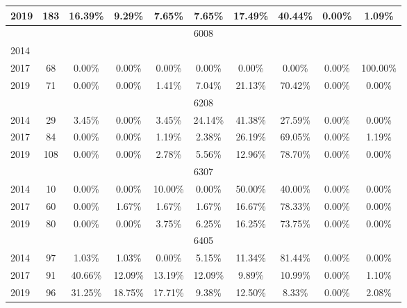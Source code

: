 \begin{table}[H]
\begin{tabular}{|l|c|ccc|ccc|cc|}
2019 & 183 & 16.39\% & 9.29\% & 7.65\% & 7.65\% & 17.49\% & 40.44\% & 0.00\% & 1.09\%\\
\hline
\hline
\multicolumn{10}{|c|}{6008}\\
\hline
2014 & & & & & & & & & \\
2017 & 68 & 0.00\% & 0.00\% & 0.00\% & 0.00\% & 0.00\% & 0.00\% & 0.00\% & 100.00\%\\
2019 & 71 & 0.00\% & 0.00\% & 1.41\% & 7.04\% & 21.13\% & 70.42\% & 0.00\% & 0.00\%\\
\hline
\hline
\multicolumn{10}{|c|}{6208}\\
\hline
2014 & 29 & 3.45\% & 0.00\% & 3.45\% & 24.14\% & 41.38\% & 27.59\% & 0.00\% & 0.00\%\\
2017 & 84 & 0.00\% & 0.00\% & 1.19\% & 2.38\% & 26.19\% & 69.05\% & 0.00\% & 1.19\%\\
2019 & 108 & 0.00\% & 0.00\% & 2.78\% & 5.56\% & 12.96\% & 78.70\% & 0.00\% & 0.00\%\\
\hline
\hline
\multicolumn{10}{|c|}{6307}\\
\hline
2014 & 10 & 0.00\% & 0.00\% & 10.00\% & 0.00\% & 50.00\% & 40.00\% & 0.00\% & 0.00\%\\
2017 & 60 & 0.00\% & 1.67\% & 1.67\% & 1.67\% & 16.67\% & 78.33\% & 0.00\% & 0.00\%\\
2019 & 80 & 0.00\% & 0.00\% & 3.75\% & 6.25\% & 16.25\% & 73.75\% & 0.00\% & 0.00\%\\
\hline
\hline
\multicolumn{10}{|c|}{6405}\\
\hline
2014 & 97 & 1.03\% & 1.03\% & 0.00\% & 5.15\% & 11.34\% & 81.44\% & 0.00\% & 0.00\%\\
2017 & 91 & 40.66\% & 12.09\% & 13.19\% & 12.09\% & 9.89\% & 10.99\% & 0.00\% & 1.10\%\\
2019 & 96 & 31.25\% & 18.75\% & 17.71\% & 9.38\% & 12.50\% & 8.33\% & 0.00\% & 2.08\%\\
\hline
\bottomrule
\end{tabular}
\end{table}
